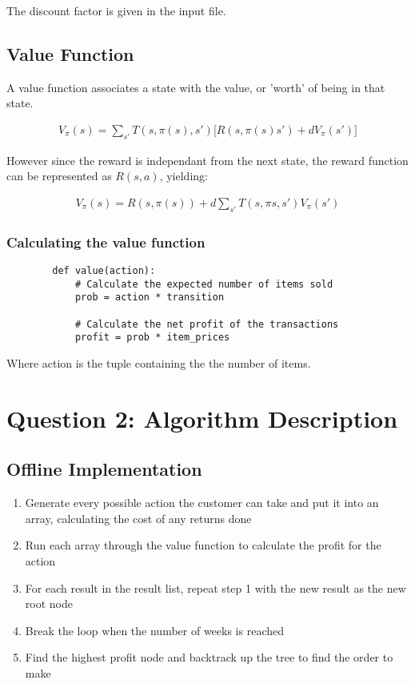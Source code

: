 \documentclass[12pt]{article}
\begin{document}
    The discount factor is given in the input file.

    \subsection{Value Function}

    A value function associates a state with the value, or 'worth' of being in that state.

    \begin{align*}
        V_{\pi}(s) = \sum_{s'} T(s, \pi(s), s') \big[ R(s, \pi(s) s') + dV_{\pi}(s') \big]
    \end{align*}

    However since the reward is independant from the next state, the reward function can be represented as $R(s, a)$, yielding:

    \begin{align*}
        V_{\pi}(s) = R(s, \pi(s)) + d\sum_{s'}T(s, \pi{s}, s') V_{\pi}(s')
    \end{align*}

    \subsubsection{Calculating the value function}

    \begin{verbatim}
        def value(action):
            # Calculate the expected number of items sold
            prob = action * transition

            # Calculate the net profit of the transactions
            profit = prob * item_prices
    \end{verbatim}

    Where action is the tuple containing the the number of items.

    \section{Question 2: Algorithm Description}

    \subsection{Offline Implementation}
        \begin{enumerate}
            \item Generate every possible action the customer can take and put it into an array, calculating the cost of any returns done
            \item Run each array through the value function to calculate the profit for the action
            \item For each result in the result list, repeat step 1 with the new result as the new root node
            \item Break the loop when the number of weeks is reached
            \item Find the highest profit node and backtrack up the tree to find the order to make
        \end{enumerate}
\end{document}
